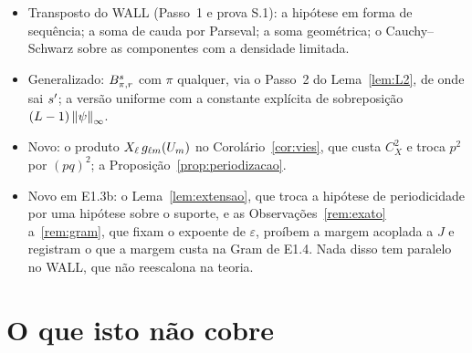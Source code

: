 \documentclass[11pt,a4paper]{article}
\begin{document}
\begin{itemize}[nosep]
  \item Transposto do WALL (Passo~1 e prova S.1): a hipótese em forma de
    sequência; a soma de cauda por Parseval; a soma geométrica; o
    Cauchy--Schwarz sobre as componentes com a densidade limitada.
  \item Generalizado: $B^{s}_{\pi,r}$ com $\pi$ qualquer, via o Passo~2
    do Lema~\ref{lem:L2}, de onde sai $s'$; a versão uniforme com a
    constante explícita de sobreposição $(L-1)\left\lVert \psi \right\rVert_{\infty}$.
  \item Novo: o produto $X_{\ell}\,g_{\ell m}(U_{m})$ no
    Corolário~\ref{cor:vies}, que custa $C_{X}^{2}$ e troca $p^{2}$ por
    $(pq)^{2}$; a Proposição~\ref{prop:periodizacao}.
  \item Novo em E1.3b: o Lema~\ref{lem:extensao}, que troca a hipótese de
    periodicidade por uma hipótese sobre o suporte, e as
    Observações~\ref{rem:exato} a~\ref{rem:gram}, que fixam o expoente de
    $\varepsilon$, proíbem a margem acoplada a $J$ e registram o que a
    margem custa na Gram de E1.4. Nada disso tem paralelo no WALL, que não
    reescalona na teoria.
\end{itemize}

\section{O que isto não cobre}
\end{document}
